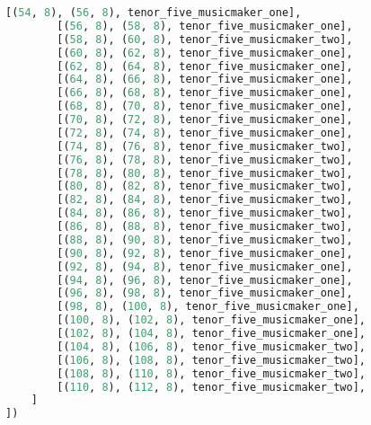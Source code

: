 \begin{lstlisting}[language=Python, caption=Invocation Source Code]
        [(54, 8), (56, 8), tenor_five_musicmaker_one],
        [(56, 8), (58, 8), tenor_five_musicmaker_one],
        [(58, 8), (60, 8), tenor_five_musicmaker_two],
        [(60, 8), (62, 8), tenor_five_musicmaker_one],
        [(62, 8), (64, 8), tenor_five_musicmaker_one],
        [(64, 8), (66, 8), tenor_five_musicmaker_one],
        [(66, 8), (68, 8), tenor_five_musicmaker_one],
        [(68, 8), (70, 8), tenor_five_musicmaker_one],
        [(70, 8), (72, 8), tenor_five_musicmaker_one],
        [(72, 8), (74, 8), tenor_five_musicmaker_one],
        [(74, 8), (76, 8), tenor_five_musicmaker_two],
        [(76, 8), (78, 8), tenor_five_musicmaker_two],
        [(78, 8), (80, 8), tenor_five_musicmaker_two],
        [(80, 8), (82, 8), tenor_five_musicmaker_two],
        [(82, 8), (84, 8), tenor_five_musicmaker_two],
        [(84, 8), (86, 8), tenor_five_musicmaker_two],
        [(86, 8), (88, 8), tenor_five_musicmaker_two],
        [(88, 8), (90, 8), tenor_five_musicmaker_two],
        [(90, 8), (92, 8), tenor_five_musicmaker_one],
        [(92, 8), (94, 8), tenor_five_musicmaker_one],
        [(94, 8), (96, 8), tenor_five_musicmaker_one],
        [(96, 8), (98, 8), tenor_five_musicmaker_one],
        [(98, 8), (100, 8), tenor_five_musicmaker_one],
        [(100, 8), (102, 8), tenor_five_musicmaker_one],
        [(102, 8), (104, 8), tenor_five_musicmaker_one],
        [(104, 8), (106, 8), tenor_five_musicmaker_two],
        [(106, 8), (108, 8), tenor_five_musicmaker_two],
        [(108, 8), (110, 8), tenor_five_musicmaker_two],
        [(110, 8), (112, 8), tenor_five_musicmaker_two],
    ]
])


\end{lstlisting}
